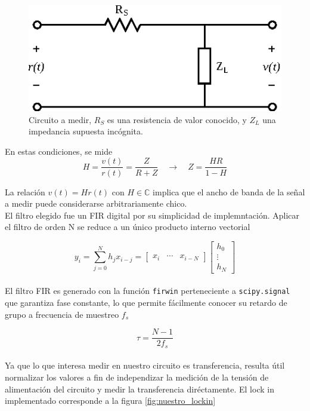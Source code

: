 \documentclass[11pt,a4paper]{extarticle}
\begin{document}
\begin{multicols}{2}
\begin{figure}[H]
	\centering
	\includegraphics[width=0.75\linewidth]{Images/transferencia.eps}
	\caption{Circuito a medir, $R_S$ es una resistencia de valor conocido, y $Z_L$ una impedancia supuesta incógnita.}
	\label{fig:transferencia}
\end{figure}

En estas condiciones, se mide 
\begin{equation}
	H = \frac{v(t)}{r(t)} = \frac{Z}{R + Z} \quad \longrightarrow \quad Z =  \frac{HR}{1-H}	
\end{equation}

La relación $v(t) = H r(t)$ con $H \in \mathbb C$ implica que el ancho de banda de la señal a medir puede considerarse arbitrariamente chico.\\

El filtro elegido fue un FIR digital por su simplicidad de implemntación. Aplicar el filtro de orden N se reduce a un único producto interno vectorial

\begin{equation}\label{eq:fir}
	y_i = \sum_{j=0}^N h_jx_{i-j}= 
	\begin{bmatrix}
		x_i & \cdots & x_{i-N}
	\end{bmatrix}
	\begin{bmatrix}
		h_0 \\ \vdots \\ h_N	
	\end{bmatrix}
\end{equation}\\[-1em]

El filtro FIR es generado con la función \texttt{firwin} perteneciente a \texttt{scipy.signal} que garantiza fase constante, lo que permite fácilmente conocer su retardo de grupo a frecuencia de muestreo $f_s$

\begin{equation}\label{eq:tau}
	\tau = \frac{N-1}{2f_s}
\end{equation}\\[-1em]

Ya que lo que interesa medir en nuestro circuito es transferencia, resulta útil normalizar los valores a fin de independizar la medición de la tensión de alimentación del circuito y medir la transferencia diréctamente. El lock in implementado corresponde a la figura \ref{fig:nuestro_lockin}


\end{multicols}
\end{document}
